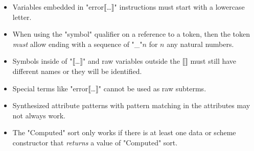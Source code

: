 \documentclass[11pt]{article} %
\begin{document}
\begin{itemize}
\item Variables embedded in "error⟦…⟧" instructions must start with a lowercase letter.

\item When using the "symbol" qualifier on a reference to a token, then the token \emph{must} allow
  ending with a sequence of "_"$n$ for $n$ any natural numbers.

\item Symbols inside of "⟦…⟧" and raw variables outside the ⟦⟧ must still have different names or
  they will be identified.

\item Special terms like "error⟦…⟧" cannot be used as raw subterms.

\item Synthesized attribute patterns with pattern matching in the attributes may not always work.

\item The "Computed" sort only works if there is at least one data or scheme constructor that
  \emph{returns} a value of "Computed" sort.

\end{itemize}



\end{document}
